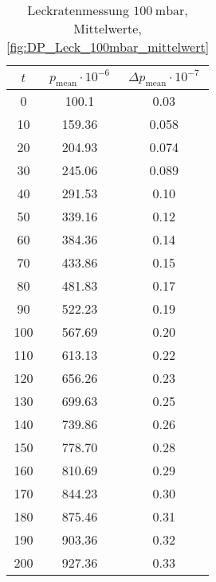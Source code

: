 \begin{table}[H]
    \centering
    \caption{Leckratenmessung $\SI{100}{\milli\bar}$, Mittelwerte, \ref{fig:DP_Leck_100mbar_mittelwert}}
    \label{tab:DP_Leck_100mbar_mittelwert}
    \begin{tabular}{c c c}
        \toprule
        {$t$} & {$p_\text{mean} \cdot 10^{-6}$} & {$\Delta p_\text{mean} \cdot 10^{-7}$}\\
        \midrule
        0   & 100.1 & 0.03  \\
        10  & 159.36 & 0.058\\
        20  & 204.93 & 0.074\\
        30  & 245.06 & 0.089\\
        40  & 291.53 & 0.10 \\
        50  & 339.16 & 0.12 \\
        60  & 384.36 & 0.14 \\
        70  & 433.86 & 0.15 \\
        80  & 481.83 & 0.17 \\
        90  & 522.23 & 0.19 \\
        100 & 567.69 & 0.20 \\
        110 & 613.13 & 0.22 \\
        120 & 656.26 & 0.23 \\
        130 & 699.63 & 0.25 \\
        140 & 739.86 & 0.26 \\
        150 & 778.70 & 0.28 \\
        160 & 810.69 & 0.29 \\
        170 & 844.23 & 0.30 \\
        180 & 875.46 & 0.31 \\
        190 & 903.36 & 0.32 \\
        200 & 927.36 & 0.33 \\
        \bottomrule
    \end{tabular}
\end{table}

